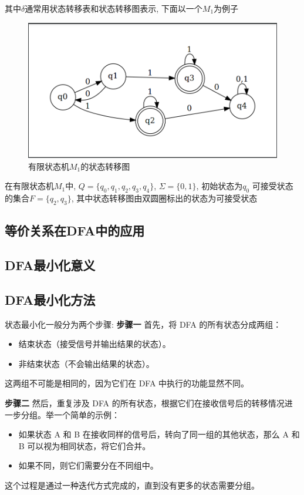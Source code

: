 \documentclass{article}
\begin{document}
    其中$\delta$通常用状态转移表和状态转移图表示, 下面以一个$M_1$为例子
    \begin{figure}[h]
        \centering
        \includegraphics[scale=0.2]{Img/dfa_example.png}
        \caption{有限状态机$M_1$的状态转移图}
    \end{figure}
    在有限状态机$M_1$中, $Q=\{q_0, q_1,q_2,q_3,q_4\}$, $\Sigma = \{0,1\}$, 初始状态为$q_0$
    可接受状态的集合$F = \{q_2, q_3\}$, 其中状态转移图由双圆圈标出的状态为可接受状态


\subsection{等价关系在DFA中的应用}

\subsection{DFA最小化意义}


\subsection{DFA最小化方法}
    状态最小化一般分为两个步骤:
    \textbf{步骤一}
    首先，将 DFA 的所有状态分成两组：
    \begin{itemize}
        \item 结束状态（接受信号并输出结果的状态）。
        \item 非结束状态（不会输出结果的状态）。 
    \end{itemize}
    这两组不可能是相同的，因为它们在 DFA 中执行的功能显然不同。   

    \textbf{步骤二}
    然后，重复涉及 DFA 的所有状态，根据它们在接收信号后的转移情况进一步分组。举一个简单的示例：
    \begin{itemize}
        \item 如果状态 A 和 B 在接收同样的信号后，转向了同一组的其他状态，那么 A 和 B 可以视为相同状态，将它们合并。
        \item 如果不同，则它们需要分在不同组中。
    \end{itemize}
    这个过程是通过一种迭代方式完成的，直到没有更多的状态需要分组。
\end{document}
